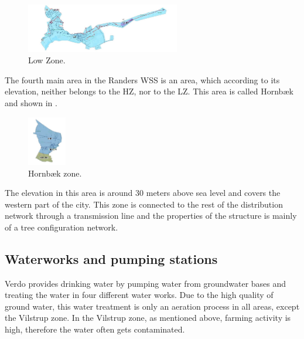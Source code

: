 \begin{figure}[H]
\centering
\includegraphics[width=0.6\textwidth]{report/pictures/Lowzone_region}
\caption{Low Zone.}
\label{fig:lowzone_region}
\end{figure}

\vspace{-3mm}

The fourth main area in the Randers WSS is an area, which according to its elevation, neither belongs to the HZ, nor to the LZ. This area is called Hornbæk and shown in .

\begin{figure}[H]
\centering
\includegraphics[width=0.15\textwidth]{report/pictures/Hornbaek_region}
\caption{Hornbæk zone.}
\label{fig:hornbaek_region}
\end{figure}

\vspace{-3mm}

The elevation in this area is around 30 meters above sea level and covers the western part of the city. This zone is connected to the rest of the distribution network through a transmission line and the properties of the structure is mainly of a tree configuration network. 

\subsection{Waterworks and pumping stations}
\label{waterworks_and_pumping_stations}

Verdo provides drinking water by pumping water from groundwater bases and treating the water in four different water works. Due to the high quality of ground water, this water treatment is only an aeration process in all areas, except the Vilstrup zone. In the Vilstrup zone, as mentioned above, farming activity is high, therefore the water often gets contaminated. 

